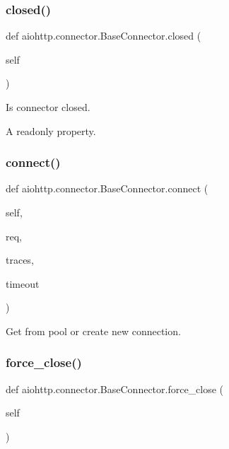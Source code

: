 \subsubsection{\texorpdfstring{closed()}{closed()}}
{\footnotesize\ttfamily def aiohttp.\+connector.\+Base\+Connector.\+closed (\begin{DoxyParamCaption}\item[{}]{self }\end{DoxyParamCaption})}

\begin{DoxyVerb}Is connector closed.

A readonly property.
\end{DoxyVerb}
 \mbox{\label{classaiohttp_1_1connector_1_1_base_connector_adee1e99f0a32023d21997dcdee945489}} 
\subsubsection{\texorpdfstring{connect()}{connect()}}
{\footnotesize\ttfamily def aiohttp.\+connector.\+Base\+Connector.\+connect (\begin{DoxyParamCaption}\item[{}]{self,  }\item[{}]{req,  }\item[{}]{traces,  }\item[{}]{timeout }\end{DoxyParamCaption})}

\begin{DoxyVerb}Get from pool or create new connection.\end{DoxyVerb}
 \mbox{\label{classaiohttp_1_1connector_1_1_base_connector_ae732f0e680ae1c5d35c57417a5cd9c4e}} 
\subsubsection{\texorpdfstring{force\+\_\+close()}{force\_close()}}
{\footnotesize\ttfamily def aiohttp.\+connector.\+Base\+Connector.\+force\+\_\+close (\begin{DoxyParamCaption}\item[{}]{self }\end{DoxyParamCaption})}

